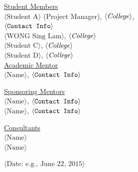 \begin{center}
\vspace{0.35in}
\underline {Student Members}\\
\vspace{5pt}
$\langle \text{Student A}\rangle$ (Project Manager), $\langle \text{\emph{College}}\rangle$,\\ 
\vspace{3pt}
$\langle \text{\texttt{Contact Info}} \rangle$\\
\vspace{5pt}
$\langle \text{WONG Sing Lam}\rangle$, $\langle \text{\emph{College}} \rangle$ \\
\vspace{3pt}
$\langle \text{Student C}\rangle$, $\langle \text{\emph{College}} \rangle$ \\
\vspace{3pt}
$\langle \text{Student D}\rangle$, $\langle \text{\emph{College}} \rangle$ \\

\vspace \shiftdownb
\underline {Academic Mentor} \\
\vspace{5pt}
$\langle \text{Name}\rangle$, $\langle \text{\texttt{Contact Info}} \rangle$

\vspace \shiftdownb
\underline {Sponsoring Mentors}\\
\vspace{5pt}
$\langle \text{Name}\rangle$, $\langle \text{\texttt{Contact Info}} \rangle$\\
\vspace{3pt}
$\langle \text{Name}\rangle$, $\langle \text{\texttt{Contact Info}} \rangle$

\vspace \shiftdownb
\underline {Consultants}\\
\vspace{5pt}
$\langle \text{Name}\rangle$\\
\vspace{3pt}
$\langle \text{Name}\rangle$

\vspace \shiftdowna
$\langle \text{Date: e.g., June 22, 2015}\rangle$ 

\end{center}


